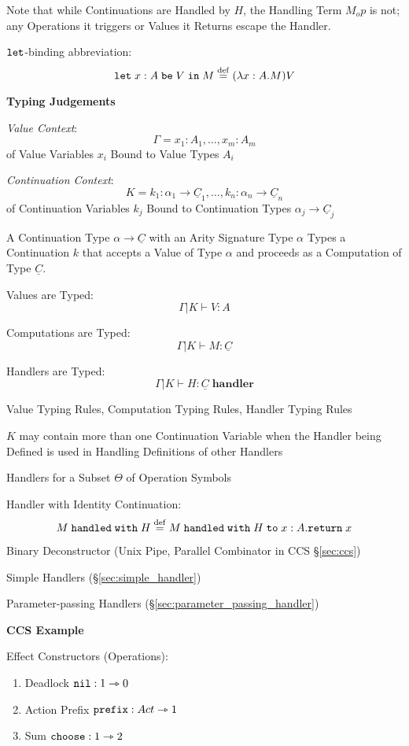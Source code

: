 \fist Note that while Continuations are Handled by $H$, the Handling
Term $M_op$ is not; any Operations it triggers or Values it
Returns escape the Handler.

$\mathtt{let}$-binding abbreviation:
\[
  \mathtt{let}\; x:A \;\mathtt{be}\; V \;\mathtt{in}\; M
    \stackrel{\mathrm{def}}= (\lambda x:A.M)V
\]


\textbf{Typing Judgements}

\emph{Value Context}:
\[
  \Gamma = x_1:A_1, \ldots,x_m:A_m
\]
of Value Variables $x_i$ Bound to Value Types $A_i$

\emph{Continuation Context}:
\[
  K = k_1:\alpha_1 \rightarrow \underline{C}_1, \ldots,
    k_n:\alpha_n \rightarrow \underline{C}_n
\]
of Continuation Variables $k_j$ Bound to Continuation Types $\alpha_j
\rightarrow \underline{C}_j$

A Continuation Type $\alpha \rightarrow \underline{C}$ with an Arity
Signature Type $\alpha$ Types a Continuation $k$ that accepts a Value
of Type $\alpha$ and proceeds as a Computation of Type
$\underline{C}$.

Values are Typed:
\[
  \Gamma | K \vdash V:A
\]

Computations are Typed:
\[
  \Gamma | K \vdash M : \underline{C}
\]

Handlers are Typed:
\[
  \Gamma | K \vdash H : \underline{C} \;\mathbf{handler}
\]

Value Typing Rules, Computation Typing Rules, Handler Typing Rules

$K$ may contain more than one Continuation Variable when the Handler
being Defined is used in Handling Definitions of other Handlers

Handlers for a Subset $\Theta$ of Operation Symbols %

Handler with Identity Continuation:
\[
  M \;\mathtt{handled\;with}\; H
    \stackrel{\mathrm{def}}= M \;\mathtt{handled\;with}\; H \;\mathtt{to}\;
      x:A.\mathtt{return}\; x
\]

Binary Deconstructor (Unix Pipe, Parallel Combinator in CCS
\S\ref{sec:ccs}) %

Simple Handlers (\S\ref{sec:simple_handler})

Parameter-passing Handlers (\S\ref{sec:parameter_passing_handler})


\textbf{CCS Example}

Effect Constructors (Operations):
\begin{enumerate}
  \item Deadlock $\mathtt{nil} : 1 \rightarrowtriangle 0$
  \item Action Prefix $\mathtt{prefix} : Act \rightarrowtriangle 1$
  \item Sum $\mathtt{choose} : 1 \rightarrowtriangle 2$
\end{enumerate}

